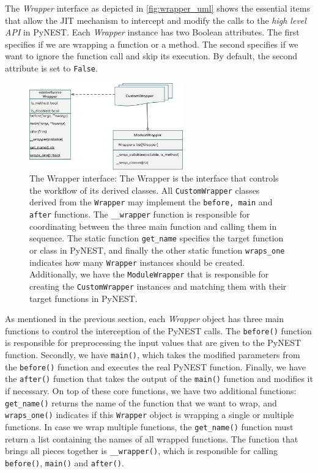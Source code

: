 The \emph{Wrapper} interface as depicted in \autoref{fig:wrapper_uml} shows the essential items that allow the JIT mechanism to intercept and modify the calls to the \emph{high level API} in PyNEST. Each \emph{Wrapper} instance has two Boolean attributes. The first specifies if we are wrapping a function or a method. The second specifies if we want to ignore the function call and skip its execution. By default, the second attribute is set to \texttt{False}.

\begin{figure}[ht!]
\centering
\includegraphics[width=0.6\textwidth]{src/pic/wrapper_uml.png}
\caption{The Wrapper interface: The Wrapper is the interface that controls the workflow of its derived classes. All \texttt{CustomWrapper} classes derived from the \texttt{Wrapper} may implement the \texttt{before, main} and \texttt{after} functions. The \texttt{\_\_wrapper} function is responsible for coordinating between the three main function and calling them in sequence. The static function \texttt{get\_name} specifies the target function or class in PyNEST, and finally the other static function \texttt{wraps\_one} indicates how many \texttt{Wrapper} instances should be created. Additionally, we have the \texttt{ModuleWrapper} that is responsible for creating the \texttt{CustomWrapper} instances and matching them with their target functions in PyNEST.}
\label{fig:wrapper_uml}
\end{figure}

As mentioned in the previous section, each \emph{Wrapper} object has three main functions to control the interception of the PyNEST calls. The \texttt{before()} function is responsible for preprocessing the input values that are given to the PyNEST function. Secondly, we have \texttt{main()}, which takes the modified parameters from the \texttt{before()} function and executes the real PyNEST function. Finally, we have the \texttt{after()} function that takes the output of the \texttt{main()} function and modifies it if necessary. On top of these core functions, we have two additional functions: \texttt{get\_name()} returns the name of the function that we want to wrap, and \texttt{wraps\_one()} indicates if this \texttt{Wrapper} object is wrapping a single or multiple functions. In case we wrap multiple functions, the \texttt{get\_name()} function must return a list containing the names of all wrapped functions. The function that brings all pieces together is \texttt{\_\_wrapper()}, which is responsible for calling \texttt{before()}, \texttt{main()} and \texttt{after()}.

